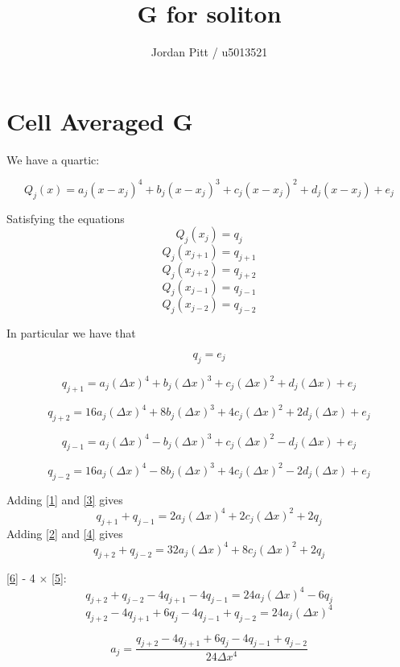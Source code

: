 \documentclass[12pt]{article}
\begin{document}
\title{G for soliton}
\author{Jordan Pitt / u5013521}

\section{Cell Averaged G}
We have a quartic:

\[Q_j(x) = a_j(x - x_j)^4 + b_j(x - x_j)^3 + c_j(x - x_j)^2 + d_j(x - x_j) + e_j\]

Satisfying the equations
\[Q_j(x_j) = q_j\]
\[Q_j(x_{j+1}) = q_{j+1}\]
\[Q_j(x_{j+2}) = q_{j+2}\]
\[Q_j(x_{j-1}) = q_{j-1}\]
\[Q_j(x_{j-2}) = q_{j-2}\]

In particular we have that

\begin{equation}
\label{e}
q_j = e_j
\end{equation}

\begin{equation}
\label{1}
q_{j+1} = a_j(\Delta x)^4 + b_j(\Delta x)^3 + c_j(\Delta x)^2 + d_j(\Delta x) + e_j
\end{equation}

\begin{equation}
\label{2}
q_{j+2} = 16a_j(\Delta x)^4 + 8b_j(\Delta x)^3 + 4c_j(\Delta x)^2 + 2d_j(\Delta x) + e_j
\end{equation}

\begin{equation}
\label{3}
q_{j-1} = a_j(\Delta x)^4 - b_j(\Delta x)^3 + c_j(\Delta x)^2 - d_j(\Delta x) + e_j
\end{equation}

\begin{equation}
\label{4}
q_{j-2} = 16a_j(\Delta x)^4 - 8b_j(\Delta x)^3 + 4c_j(\Delta x)^2 - 2d_j(\Delta x) + e_j
\end{equation}

Adding \eqref{1} and \eqref{3} gives
\begin{equation}
\label{5}
q_{j+1} + q_{j-1} = 2a_j(\Delta x)^4 + 2c_j(\Delta x)^2 + 2q_j
\end{equation}
Adding \eqref{2} and \eqref{4} gives
\begin{equation}
\label{6}
q_{j+2} + q_{j-2} = 32a_j(\Delta x)^4 + 8c_j(\Delta x)^2 + 2q_j
\end{equation}

\eqref{6} - 4 $\times$ \eqref{5}:
\[q_{j+2} + q_{j-2} -4q_{j+1} -4q_{j-1} = 24a_j(\Delta x)^4 - 6q_j\]
\[q_{j+2} -4q_{j+1} + 6q_j -4q_{j-1}  + q_{j-2} = 24a_j(\Delta x)^4 \]

\begin{equation}
\label{a}
a_j = \frac{q_{j+2} -4q_{j+1} + 6q_j -4q_{j-1}  + q_{j-2}}{24 \Delta x^4 }
\end{equation}
\end{document}
